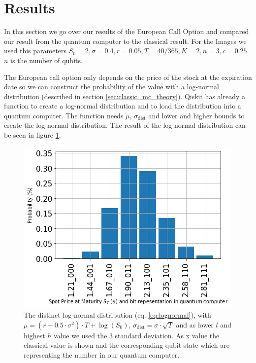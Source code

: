 \section{Results}
In this section we go over our results of the European Call Option and compared our result from the quantum computer to the classical result. For the Images we used this parameters $S_0 = 2, \sigma = 0.4, r=0.05, T=40/365, K=2, n=3, c=0.25$. $n$ is the number of qubits.

The European call option only depends on the price of the stock at the expiration date so we can construct the probability of the value with a log-normal distribution (described in section \ref{sec:classic_mc_theory}). Qiskit has already a function to create a log-normal distribution and to load the distribution into a quantum computer. The function needs $\mu$, $\sigma_{\text{dist}}$ and lower and higher bounds to create the log-normal distribution. The result of the log-normal distribution can be seen in figure \ref{fig:E_log-normal}.
\begin{figure}[H]
  \begin{center}
    \includegraphics[width=0.5\linewidth]{images/probability.png}
  \end{center}
  \caption{The distinct log-normal distribution (eq. \ref{eq:lognormal}), with $\mu=(r-0.5\cdot \sigma^2)\cdot T + \log(S_0)$, $\sigma_{\text{dist}}=\sigma \cdot \sqrt{T}$ and as lower $l$ and highest $h$ value we used the 3 standard deviation. As x value the classical value is shown and the corresponding qubit state which are representing the number in our quantum computer.}
  \label{fig:E_log-normal}
\end{figure}

